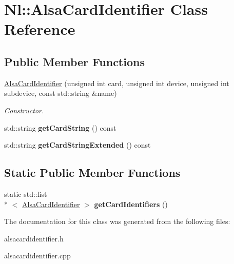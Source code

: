 \hypertarget{classNl_1_1AlsaCardIdentifier}{\section{Nl\-:\-:Alsa\-Card\-Identifier Class Reference}
\label{classNl_1_1AlsaCardIdentifier}
}
\subsection*{Public Member Functions}
\begin{DoxyCompactItemize}
\item 
\hyperlink{group__Audio_ga3e419719a775f61b40481f3f514f1d36}{Alsa\-Card\-Identifier} (unsigned int card, unsigned int device, unsigned int subdevice, const std\-::string \&name)
\begin{DoxyCompactList}\small\item\em Constructor. \end{DoxyCompactList}\item 
\hypertarget{classNl_1_1AlsaCardIdentifier_a6e999098d33b3115cc62af581041d352}{std\-::string {\bfseries get\-Card\-String} () const }\label{classNl_1_1AlsaCardIdentifier_a6e999098d33b3115cc62af581041d352}

\item 
\hypertarget{classNl_1_1AlsaCardIdentifier_a7ce40c38b1559830ce9e90fc5e81a9d1}{std\-::string {\bfseries get\-Card\-String\-Extended} () const }\label{classNl_1_1AlsaCardIdentifier_a7ce40c38b1559830ce9e90fc5e81a9d1}

\end{DoxyCompactItemize}
\subsection*{Static Public Member Functions}
\begin{DoxyCompactItemize}
\item 
\hypertarget{classNl_1_1AlsaCardIdentifier_a6c8576c1f683cfef2a910f5986107115}{static std\-::list\\*
$<$ \hyperlink{classNl_1_1AlsaCardIdentifier}{Alsa\-Card\-Identifier} $>$ {\bfseries get\-Card\-Identifiers} ()}\label{classNl_1_1AlsaCardIdentifier_a6c8576c1f683cfef2a910f5986107115}

\end{DoxyCompactItemize}


The documentation for this class was generated from the following files\-:\begin{DoxyCompactItemize}
\item 
alsacardidentifier.\-h\item 
alsacardidentifier.\-cpp\end{DoxyCompactItemize}
